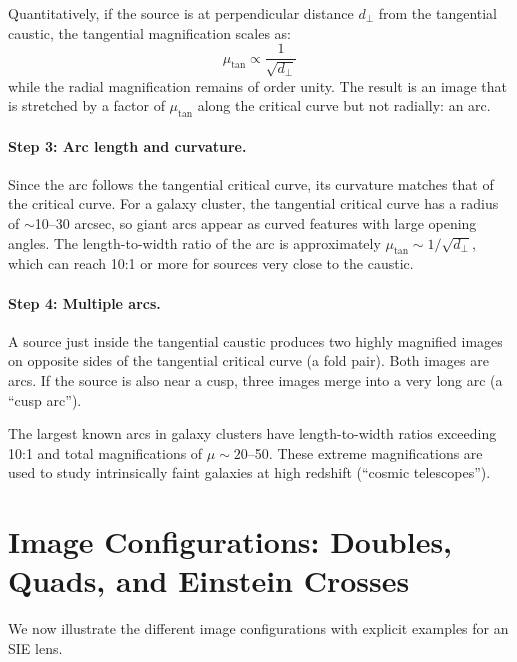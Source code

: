 Quantitatively, if the source is at perpendicular distance
$d_\perp$ from the tangential caustic, the tangential magnification
scales as:
\begin{equation}
    \mu_{\mathrm{tan}} \propto \frac{1}{\sqrt{d_\perp}}
    \label{eq:tangential_magnification}
\end{equation}
while the radial magnification remains of order unity.  The result
is an image that is stretched by a factor of $\mu_{\mathrm{tan}}$
along the critical curve but not radially: an arc.

\paragraph{Step 3: Arc length and curvature.}
Since the arc follows the tangential critical curve, its curvature
matches that of the critical curve.  For a galaxy cluster, the
tangential critical curve has a radius of $\sim$10--30 arcsec, so
giant arcs appear as curved features with large opening angles.
The length-to-width ratio of the arc is approximately
$\mu_{\mathrm{tan}} \sim 1/\sqrt{d_\perp}$, which can reach
10:1 or more for sources very close to the caustic.

\paragraph{Step 4: Multiple arcs.}
A source just inside the tangential caustic produces two highly
magnified images on opposite sides of the tangential critical curve
(a fold pair).  Both images are arcs.  If the source is also near a
cusp, three images merge into a very long arc (a ``cusp arc'').

\begin{remark}
The largest known arcs in galaxy clusters have length-to-width ratios
exceeding 10:1 and total magnifications of $\mu \sim 20$--50.  These
extreme magnifications are used to study intrinsically faint galaxies
at high redshift (``cosmic telescopes'').
\end{remark}


\section{Image Configurations: Doubles, Quads, and Einstein Crosses}
\label{sec:image_configurations}

We now illustrate the different image configurations with explicit
examples for an SIE lens.

